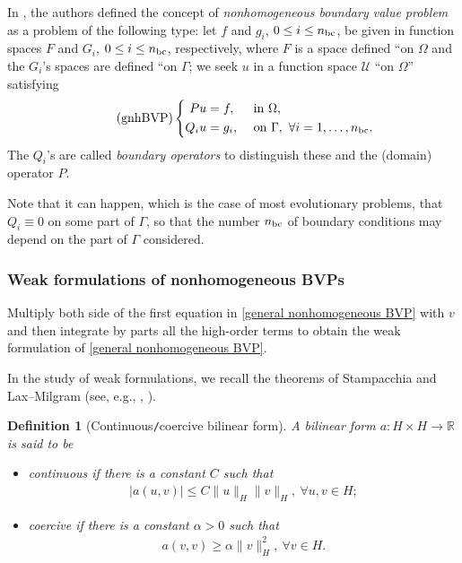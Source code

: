 \documentclass[oneside,11pt]{book}
\numberwithin{equation}{section}
\newtheorem{definition}{Definition}[section]
\begin{document}
In \cite{Lions_Magenes1972}, the authors defined the concept of \textit{nonhomogeneous boundary value problem} as a problem of the following type: let $f$ and $g_i$, $0\le i\le n_{\rm bc}$, be given in function spaces $F$ and $G_i$, $0\le i\le n_{\rm bc}$, respectively, where $F$ is a space defined ``on $\Omega$ and the $G_i$'s spaces are defined ``on $\Gamma$; we seek $u$ in a function space $\mathcal{U}$ ``on $\Omega$'' satisfying
\begin{equation}
    \label{general nonhomogeneous BVP}
    \tag{gnhBVP}
    \left\{\begin{split}
        Pu &= f,&&\mbox{ in }\Omega,\\
        Q_iu &= g_i,&&\mbox{ on }\Gamma,\ \forall i = 1,\ldots,n_{\rm bc}.
    \end{split}\right.
\end{equation}
The $Q_i$'s are called \textit{boundary operators} to distinguish these and the (domain) operator $P$.

Note that it can happen, which is the case of most evolutionary problems, that $Q_i\equiv 0$ on some part of $\Gamma$, so that the number $n_{\rm bc}$ of boundary conditions may depend on the part of $\Gamma$ considered.

\subsubsection{Weak formulations of nonhomogeneous BVPs}
Multiply both side of the first equation in \eqref{general nonhomogeneous BVP} with $v$ and then integrate by parts all the high-order terms to obtain the weak formulation of \eqref{general nonhomogeneous BVP}.

In the study of weak formulations, we recall the theorems of Stampacchia and Lax--Milgram (see, e.g., \cite[Sect. 5.3]{Brezis2011}, \cite[Subsect. I.2.2]{Temam2000}).

\begin{definition}[Continuous\texttt{/}coercive bilinear form]
    A bilinear form $a:H\times H\to\mathbb{R}$ is said to be
    \begin{itemize}
        \item[(i)] \emph{continuous} if there is a constant $C$ such that
        \begin{align*}
            |a(u,v)|\le C\|u\|_H\|v\|_H,\ \forall u,v\in H;
        \end{align*}
        \item[(ii)] \emph{coercive} if there is a constant $\alpha > 0$ such that
        \begin{align*}
            a(v,v)\ge\alpha\|v\|_H^2,\ \forall v\in H.
        \end{align*}
    \end{itemize}
\end{definition}
\end{document}
